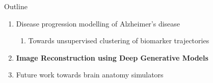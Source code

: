 \documentclass[8pt,xcolor=table,aspectratio=169]{beamer}
\begin{document}
\begin{frame}{Outline}

\begin{enumerate}
 \item Disease progression modelling of Alzheimer's disease
 \begin{enumerate} 
  \item Towards unsupervised clustering of biomarker trajectories\\
 \end{enumerate}
   
 
  
  \vt

 \item \textbf{Image Reconstruction using Deep Generative Models}\\
\brgmoursshort
\vt
 
  \item Future work towards brain anatomy simulators\\


\end{enumerate}
\end{frame}


 
\end{document}
